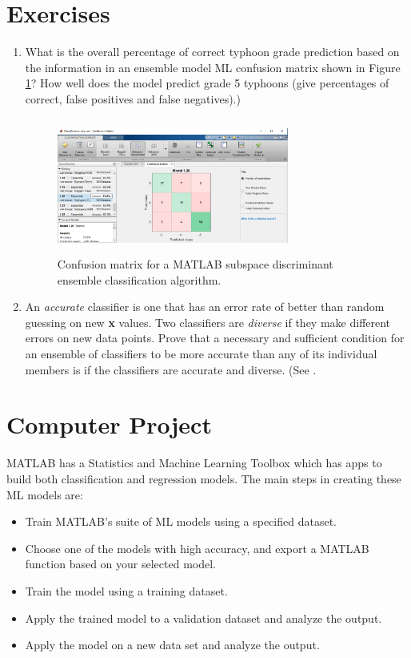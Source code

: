\documentclass{SBCbookchapter}
\begin{document}
	\newpage
	
	\section{Exercises}  
	
	\begin{enumerate}
		\item What is the overall percentage of correct typhoon grade prediction based on the information in an ensemble model ML confusion matrix shown in Figure \ref{EnsembleClass}? How well does the model predict grade 5 typhoons (give percentages of correct, false positives and false negatives).)
		\begin{figure}[!htpb]
			\centering
			\includegraphics[width=3in,height=1.75in]{Ensemblefig1.png}
			\caption{Confusion matrix for a MATLAB subspace discriminant ensemble classification algorithm.}
			\label{EnsembleClass}
		\end{figure}
		
		\item An \emph{accurate} classifier is one that has an
		error rate of better than random guessing on new {\bf x} values. Two classifiers are \emph{diverse} if they make different errors on new data points. Prove that a necessary and sufficient condition for an ensemble of classifiers to be more
		accurate than any of its individual members is if the classifiers are accurate and
		diverse. (See \cite{Hansen}.
		
		
	\end{enumerate}
	\newpage
	\section{Computer Project}

	MATLAB has a Statistics and Machine Learning Toolbox which has apps to build both classification and regression models.  The main steps in creating these ML models are:
	
	\begin{itemize}
		\item Train MATLAB's suite of ML models using a specified dataset.
		\item Choose one of the models with high accuracy, and export a MATLAB function based on your selected model.
		\item Train the model using a training dataset.
		\item Apply the trained model to a validation dataset and analyze the output.
		\item Apply the model on a new data set and analyze the output. 
	\end{itemize} 
	
\end{document}
